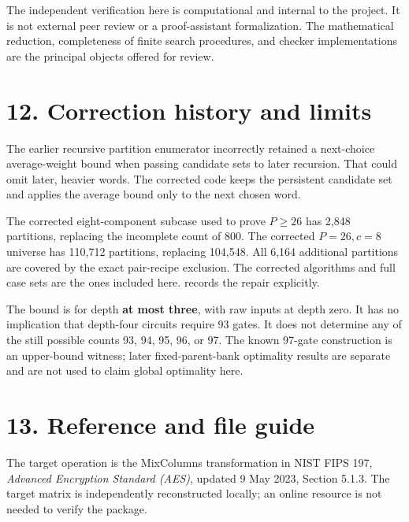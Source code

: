 The independent verification here is computational and internal to the project. It is not external peer review or a proof-assistant formalization. The mathematical reduction, completeness of finite search procedures, and checker implementations are the principal objects offered for review.

\hypertarget{correction-history-and-limits}{%
\section{12. Correction history and limits}\label{correction-history-and-limits}}

The earlier recursive partition enumerator incorrectly retained a next-choice average-weight bound when passing candidate sets to later recursion. That could omit later, heavier words. The corrected code keeps the persistent candidate set and applies the average bound only to the next chosen word.

The corrected eight-component subcase used to prove \(P\geq26\) has 2,848 partitions, replacing the incomplete count of 800. The corrected \(P=26,c=8\) universe has 110,712 partitions, replacing 104,548. All 6,164 additional partitions are covered by the exact pair-recipe exclusion. The corrected algorithms and full case sets are the ones included here. \texttt{} records the repair explicitly.

The bound is for depth \textbf{at most three}, with raw inputs at depth zero. It has no implication that depth-four circuits require 93 gates. It does not determine any of the still possible counts 93, 94, 95, 96, or 97. The known 97-gate construction is an upper-bound witness; later fixed-parent-bank optimality results are separate and are not used to claim global optimality here.

\hypertarget{reference-and-file-guide}{%
\section{13. Reference and file guide}\label{reference-and-file-guide}}

The target operation is the MixColumns transformation in NIST FIPS 197, \emph{Advanced Encryption Standard (AES)}, updated 9 May 2023, Section 5.1.3. The target matrix is independently reconstructed locally; an online resource is not needed to verify the package.

